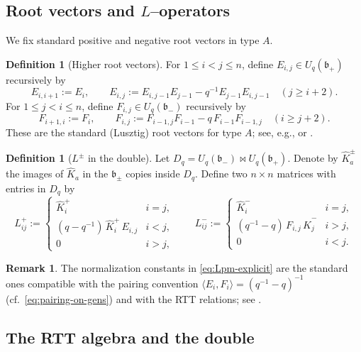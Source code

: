 \documentclass[11pt]{article}
\newcommand{\Uc}{U}
\newcommand{\fb}{\mathfrak{b}}
\newcommand{\la}{\langle}
\newcommand{\ra}{\rangle}
\newcommand{\bipr}{\bowtie}
\theoremstyle{plain}
\theoremstyle{definition}
\newtheorem{definition}[theorem]{Definition}
\newtheorem{remark}[theorem]{Remark}
\begin{document}
\subsection{Root vectors and $L$--operators}

We fix standard positive and negative root vectors in type $A$.

\begin{definition}[Higher root vectors]
For $1\le i<j\le n$, define $E_{i,j}\in \Uc_q(\fb_+)$ recursively by
\[
E_{i,i+1}:=E_i,\qquad
E_{i,j}:=E_{i,j-1}E_{j-1}-q^{-1}E_{j-1}E_{i,j-1}\quad (j\ge i+2).
\]
For $1\le j<i\le n$, define $F_{i,j}\in \Uc_q(\fb_-)$ recursively by
\[
F_{i+1,i}:=F_i,\qquad
F_{i,j}:=F_{i-1,j}F_{i-1}-q\,F_{i-1}F_{i-1,j}\quad (i\ge j+2).
\]
These are the standard (Lusztig) root vectors for type $A$; see, e.g., \cite[Ch.~8]{KS} or \cite[Ch.~8]{CP}.
\end{definition}

\begin{definition}[$L^\pm$ in the double]\label{def:Lpm}
Let $D_q=\Uc_q(\fb_-)\bipr \Uc_q(\fb_+)$.
Denote by $\hat K_a^\pm$ the images of $\hat K_a$ in the $\fb_\pm$ copies inside $D_q$.
Define two $n\times n$ matrices with entries in $D_q$ by
\begin{equation}\label{eq:Lpm-explicit}
L^+_{ij}:=
\begin{cases}
\hat K_i^+ & i=j,\\[2pt]
(q-q^{-1})\,\hat K_i^+\,E_{i,j} & i<j,\\[2pt]
0 & i>j,
\end{cases}
\qquad
L^-_{ij}:=
\begin{cases}
\hat K_i^- & i=j,\\[2pt]
(q^{-1}-q)\,F_{i,j}\,\hat K_j^- & i>j,\\[2pt]
0 & i<j.
\end{cases}
\end{equation}
\end{definition}

\begin{remark}
The normalization constants in \eqref{eq:Lpm-explicit} are the standard ones compatible with the pairing convention $\la E_i,F_i\ra=(q^{-1}-q)^{-1}$ (cf.\ \eqref{eq:pairing-on-gens}) and with the RTT relations; see \cite[\S9.3--\S9.5]{KS}.
\end{remark}

\subsection{The RTT algebra and the double}
\end{document}
